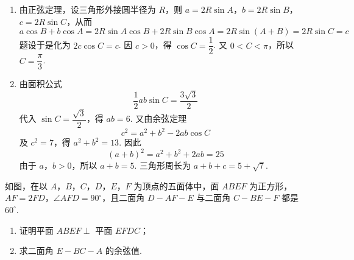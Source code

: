 \begin{solution}
\begin{enumerate}
\item 由正弦定理，设三角形外接圆半径为 \(R\)，则 \(a=2R\sin A\)，\(b=2R\sin B\)，\(c=2R\sin C\)，从而
\[
a\cos B+b\cos A
=2R\sin A\cos B+2R\sin B\cos A
=2R\sin(A+B)
=2R\sin C=c
\]
题设于是化为 \(2c\cos C=c\). 因 \(c>0\)，得 \(\cos C=\dfrac12\). 又 \(0<C<\pi\)，所以 \(C=\dfrac\pi3\).
\item 由面积公式
\[
\frac12ab\sin C=\frac{3\sqrt3}{2}
\]
代入 \(\sin C=\dfrac{\sqrt3}{2}\)，得 \(ab=6\). 又由余弦定理
\[
c^2=a^2+b^2-2ab\cos C
\]
及 \(c^2=7\)，得 \(a^2+b^2=13\). 因此
\[
(a+b)^2=a^2+b^2+2ab=25
\]
由于 \(a\)，\(b>0\)，所以 \(a+b=5\). 三角形周长为 \(a+b+c=5+\sqrt7\).
\end{enumerate}
\end{solution}


\begin{problem}
如图，在以 \(A\)，\(B\)，\(C\)，\(D\)，\(E\)，\(F\) 为顶点的五面体中，面 \(ABEF\) 为正方形，\(AF=2FD\)，\(\angle AFD=90^\circ\)，且二面角 \(D-AF-E\) 与二面角 \(C-BE-F\) 都是 \(60^\circ\).

\begin{enumerate}
\item 证明平面 \(ABEF\perp\) 平面 \(EFDC\)；
\item 求二面角 \(E-BC-A\) 的余弦值.
\end{enumerate}

\end{problem}

